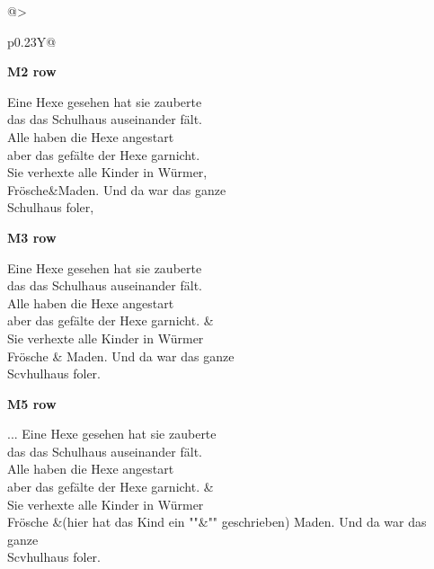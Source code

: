 \begin{table}[p]
\begin{tabularx}{\linewidth}{@{}>{\raggedright\arraybackslash}p{0.23\linewidth}Y@{}}
\begin{minipage}[t]{\hsize}
      \textbf{M2 row}\par
      {\raggedright\ttfamily
      Eine Hexe gesehen hat sie zauberte\excerptnl\\
      das das Schulhaus auseinander fält.\excerptnl\\
      Alle haben die Hexe angestart\excerptnl\\
      aber das gefälte der Hexe garnicht.\excerptnl\\
      Sie verhexte alle Kinder in Würmer,\excerptnl\\
      Frösche\&Maden. Und da war das ganze\excerptnl\\
      Schulhaus foler,\par}
      \vspace{0.3em}
      \textbf{M3 row}\par
      {\raggedright\ttfamily
      Eine Hexe gesehen hat sie zauberte\excerptnl\\
      das das Schulhaus auseinander fält.\excerptnl\\
      Alle haben die Hexe angestart\excerptnl\\
      aber das gefälte der Hexe garnicht. \&\excerptnl\\
      Sie verhexte alle Kinder in Würmer\excerptnl\\
      Frösche \& Maden. Und da war das ganze\excerptnl\\
      Scvhulhaus foler.\par}
      \vspace{0.3em}
      \textbf{M5 row}\par
      {\raggedright\ttfamily
      ... Eine Hexe gesehen hat sie zauberte\excerptnl\\
      das das Schulhaus auseinander fält.\excerptnl\\
      Alle haben die Hexe angestart\excerptnl\\
      aber das gefälte der Hexe garnicht. \&\excerptnl\\
      Sie verhexte alle Kinder in Würmer\excerptnl\\
      Frösche \&(hier hat das Kind ein ""\&"" geschrieben) Maden. Und da war das ganze\excerptnl\\
      Scvhulhaus foler.\par}
    \end{minipage}
    \\
    \bottomrule
  \end{tabularx}
\end{table}

